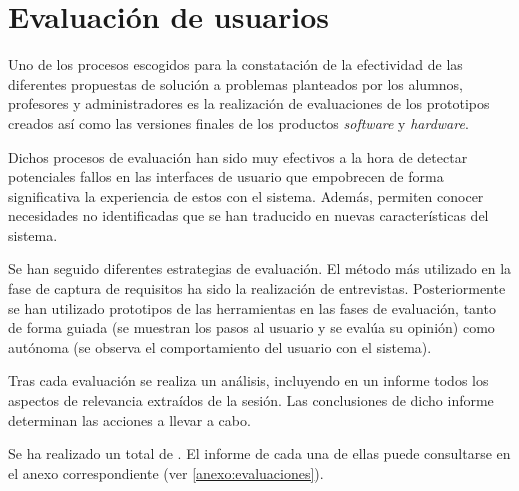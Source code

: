 \section{Evaluación de usuarios}

Uno de los procesos escogidos para la constatación de la efectividad de las diferentes propuestas de solución a problemas planteados por los alumnos, profesores y administradores es la realización de evaluaciones de los prototipos creados así como las versiones finales de los productos \textit{software} y \textit{hardware}.

Dichos procesos de evaluación han sido muy efectivos a la hora de detectar potenciales fallos en las interfaces de usuario que empobrecen de forma significativa la experiencia de estos con el sistema. Además, permiten conocer necesidades no identificadas que se han traducido en nuevas características del sistema.

Se han seguido diferentes estrategias de evaluación. El método más utilizado en la fase de captura de requisitos ha sido la realización de entrevistas. Posteriormente se han utilizado prototipos de las herramientas en las fases de evaluación, tanto de forma guiada (se muestran los pasos al usuario y se evalúa su opinión) como autónoma (se observa el comportamiento del usuario con el sistema).

Tras cada evaluación se realiza un análisis, incluyendo en un informe todos los aspectos de relevancia extraídos de la sesión. Las conclusiones de dicho informe determinan las acciones a llevar a cabo.

Se ha realizado un total de . El informe de cada una de ellas puede consultarse en el anexo correspondiente (ver \ref{anexo:evaluaciones}).